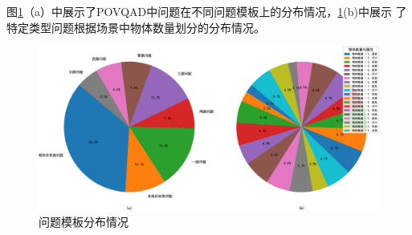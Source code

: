 图\ref{fig:template_statistics}（a）中展示了POVQAD中问题在不同问题模板上的分布情况，\ref{fig:template_statistics}(b)中展示
了特定类型问题根据场景中物体数量划分的分布情况。
\begin{figure}[h]
    \centering
    \includegraphics[scale=0.45]{figures/question_template_distribution-crop.pdf}
    \caption{问题模板分布情况}
    \label{fig:template_statistics}
\end{figure}

